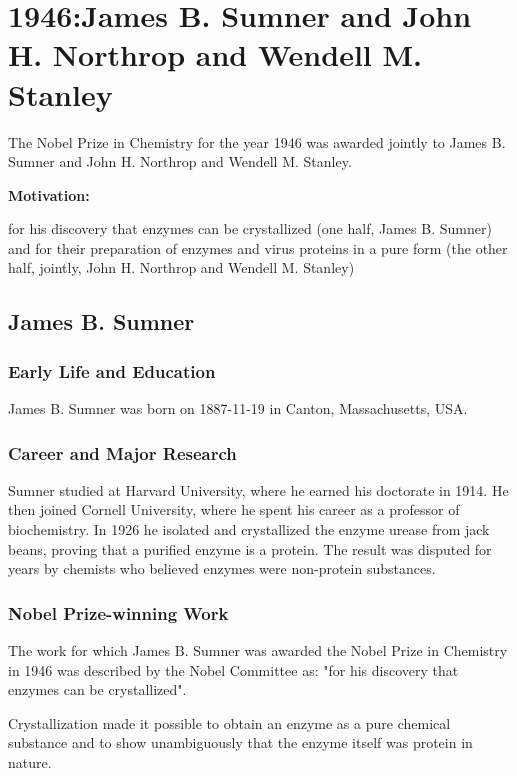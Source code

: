 \chapter{1946:James B. Sumner and John H. Northrop and Wendell M. Stanley}

\label{chap:chemistry1946}

The Nobel Prize in Chemistry for the year 1946 was awarded jointly to James B. Sumner and John H. Northrop and Wendell M. Stanley.

\textbf{Motivation:}

for his discovery that enzymes can be crystallized (one half, James B. Sumner) and for their preparation of enzymes and virus proteins in a pure form (the other half, jointly, John H. Northrop and Wendell M. Stanley)

\section{James B. Sumner}

\subsection*{Early Life and Education}

James B. Sumner was born on 1887-11-19 in Canton, Massachusetts, USA.

\subsection*{Career and Major Research}

Sumner studied at Harvard University, where he earned his doctorate in 1914. He then joined Cornell University, where he spent his career as a professor of biochemistry. In 1926 he isolated and crystallized the enzyme urease from jack beans, proving that a purified enzyme is a protein. The result was disputed for years by chemists who believed enzymes were non-protein substances.

\subsection*{Nobel Prize-winning Work}

The work for which James B. Sumner was awarded the Nobel Prize in Chemistry in 1946 was described by the Nobel Committee as: "for his discovery that enzymes can be crystallized".

Crystallization made it possible to obtain an enzyme as a pure chemical substance and to show unambiguously that the enzyme itself was protein in nature.

